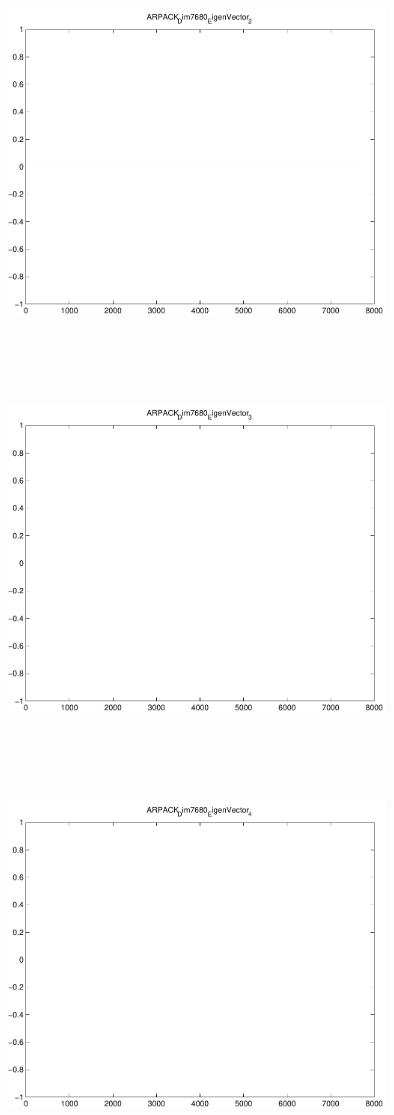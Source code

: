 \documentclass[9pt]{article}
\theoremstyle{plain}
\theoremstyle{definition}
\theoremstyle{remark}
\numberwithin{equation}{section}
\begin{document}
\includegraphics[width=10.0cm,height=10.0cm]{ARPACK_Dim7680_EigenVector_2.pdf}

\includegraphics[width=10.0cm,height=10.0cm]{ARPACK_Dim7680_EigenVector_3.pdf}

\includegraphics[width=10.0cm,height=10.0cm]{ARPACK_Dim7680_EigenVector_4.pdf}
\end{document}
